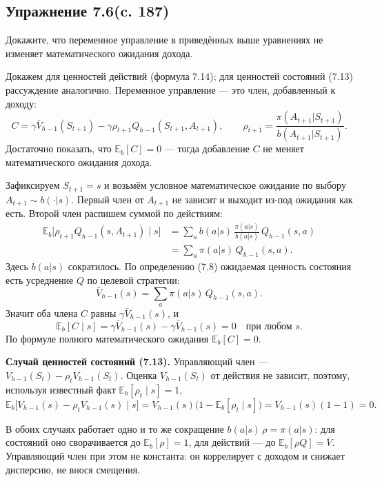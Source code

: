 \subsection{Упражнение 7.6(c. 187)}
Докажите, что переменное управление в приведённых выше уравнениях не изменяет
математического ожидания дохода.
\begin{solution}
    Докажем для ценностей действий (формула 7.14); для ценностей состояний
    (7.13) рассуждение аналогично. Переменное управление --- это член,
    добавленный к доходу:
    \[
    C = \gamma\bar V_{h-1}(S_{t+1}) - \gamma\rho_{t+1}Q_{h-1}(S_{t+1}, A_{t+1}),
    \qquad \rho_{t+1} = \frac{\pi(A_{t+1}|S_{t+1})}{b(A_{t+1}|S_{t+1})}.
    \]
    Достаточно показать, что $\mathbb{E}_b[C] = 0$ --- тогда добавление $C$ не
    меняет математического ожидания дохода.

    Зафиксируем $S_{t+1} = s$ и возьмём условное математическое ожидание по
    выбору $A_{t+1} \sim b(\cdot|s)$. Первый член от $A_{t+1}$ не зависит и
    выходит из-под ожидания как есть. Второй член распишем суммой по действиям:
    \[
    \begin{aligned}
    \mathbb{E}_b\bigl[\rho_{t+1}Q_{h-1}(s, A_{t+1}) \mid s\bigr]
    &= \sum_a b(a|s)\,\frac{\pi(a|s)}{b(a|s)}\,Q_{h-1}(s, a) \\
    &= \sum_a \pi(a|s)\,Q_{h-1}(s, a).
    \end{aligned}
    \]
    Здесь $b(a|s)$ сократилось. По определению (7.8) ожидаемая ценность состояния
    есть усреднение $Q$ по целевой стратегии:
    \[
    \bar V_{h-1}(s) = \sum_a \pi(a|s)\,Q_{h-1}(s, a).
    \]
    Значит оба члена $C$ равны $\gamma\bar V_{h-1}(s)$, и
    \[
    \mathbb{E}_b[C \mid s]
    = \gamma\bar V_{h-1}(s) - \gamma\bar V_{h-1}(s) = 0
    \quad \text{при любом } s.
    \]
    По формуле полного математического ожидания $\mathbb{E}_b[C] = 0$.

    \textbf{Случай ценностей состояний (7.13).} Управляющий член ---
    $V_{h-1}(S_t) - \rho_t V_{h-1}(S_t)$. Оценка $V_{h-1}(S_t)$ от действия не
    зависит, поэтому, используя известный факт $\mathbb{E}_b[\rho_t \mid s] = 1$,
    \[
    \mathbb{E}_b\bigl[V_{h-1}(s) - \rho_t V_{h-1}(s) \mid s\bigr]
    = V_{h-1}(s)\bigl(1 - \mathbb{E}_b[\rho_t \mid s]\bigr)
    = V_{h-1}(s)(1 - 1) = 0.
    \]

    В обоих случаях работает одно и то же сокращение $b(a|s)\,\rho = \pi(a|s)$:
    для состояний оно сворачивается до $\mathbb{E}_b[\rho] = 1$, для действий ---
    до $\mathbb{E}_b[\rho Q] = \bar V$. Управляющий член при этом не константа:
    он коррелирует с доходом и снижает дисперсию, не внося смещения.
\end{solution}

